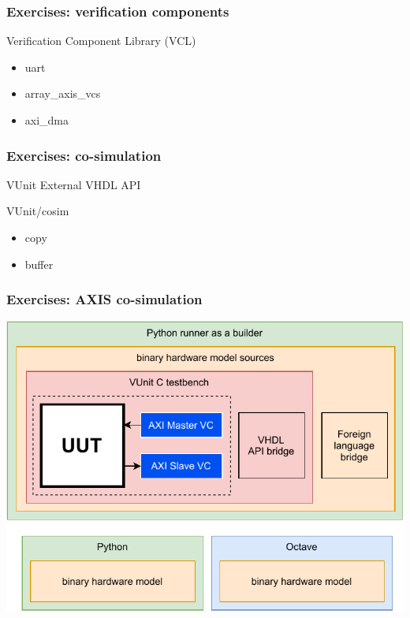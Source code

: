 \documentclass{beamer}
\begin{document}
\begin{frame}
\frametitle{Exercises: verification components}
Verification Component Library (VCL) \href{http://vunit.github.io/verification_components/user_guide.html}{\faBook}
\vspace{1em}
\begin{itemize}
  \item uart
  \href{https://github.com/VUnit/vunit/tree/master/examples/vhdl/uart}{\faCode}
  \vspace{1em}

  \item array\_axis\_vcs
  \href{https://github.com/VUnit/vunit/tree/master/examples/vhdl/array_axis_vcs}{\faCode}
  \vspace{1em}

  \item axi\_dma
  \href{https://github.com/VUnit/vunit/tree/master/examples/vhdl/axi_dma}{\faCode}
\end{itemize}
\end{frame}

\begin{frame}
\frametitle{Exercises: co-simulation}
VUnit External VHDL API \href{http://vunit.github.io/data_types/user_guide.html\#external-vhdl-api}{\faBook}
\vspace{1em}

VUnit/cosim \href{https://vunit.github.io/cosim}{\faBook}
\vspace{1em}
\begin{itemize}
  \item copy
  \href{https://vunit.github.io/cosim/examples/copy.html}{\faBook}
  \href{https://github.com/VUnit/cosim/tree/master/examples/copy}{\faCode}
  \vspace{1em}

  \item buffer
  \href{https://vunit.github.io/cosim/examples/buffer.html}{\faBook}
  \href{https://github.com/VUnit/cosim/tree/master/examples/buffer}{\faCode}
\end{itemize}
\end{frame}

\begin{frame}
\frametitle{Exercises: AXIS co-simulation}
\centering
\includegraphics[width=.8\linewidth]{vunit_axiscosim.pdf}
\end{frame}
\end{document}

